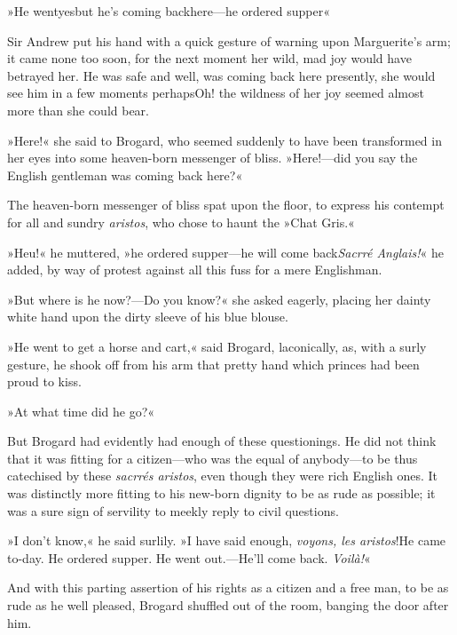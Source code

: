 »He went\textellipsis \allowbreak  yes\textellipsis \allowbreak  but he's coming back\textellipsis \allowbreak  here—he ordered supper\textellipsis«

Sir Andrew put his hand with a quick gesture of warning upon Marguerite's arm; it came none too soon, for the next moment her wild, mad joy would have betrayed her. He was safe and well, was coming back here presently, she would see him in a few moments perhaps\textellipsis \allowbreak  Oh! the wildness of her joy seemed almost more than she could bear.

»Here!« she said to Brogard, who seemed suddenly to have been transformed in her eyes into some heaven-born messenger of bliss. »Here!—did you say the English gentleman was coming back here?«

The heaven-born messenger of bliss spat upon the floor, to express his contempt for all and sundry \textit{aristos}, who chose to haunt the »Chat Gris.«

»Heu!« he muttered, »he ordered supper—he will come back\textellipsis \allowbreak  \textit{Sacrré Anglais!}« he added, by way of protest against all this fuss for a mere Englishman.

»But where is he now?—Do you know?« she asked eagerly, placing her dainty white hand upon the dirty sleeve of his blue blouse.

»He went to get a horse and cart,« said Brogard, laconically, as, with a surly gesture, he shook off from his arm that pretty hand which princes had been proud to kiss.

»At what time did he go?«

But Brogard had evidently had enough of these questionings. He did not think that it was fitting for a citizen—who was the equal of anybody—to be thus catechised by these \textit{sacrrés aristos}, even though they were rich English ones. It was distinctly more fitting to his new-born dignity to be as rude as possible; it was a sure sign of servility to meekly reply to civil questions.

»I don't know,« he said surlily. »I have said enough, \textit{voyons, les aristos}!\textellipsis \allowbreak  He came to-day. He ordered supper. He went out.—He'll come back. \textit{Voilà!}«

And with this parting assertion of his rights as a citizen and a free man, to be as rude as he well pleased, Brogard shuffled out of the room, banging the door after him.